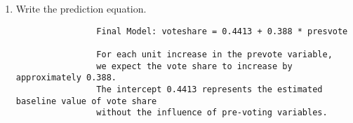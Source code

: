 \documentclass[12pt,letterpaper]{article}
\begin{document}
\begin{enumerate}
\begin{footnotesize}
\begin{verbatim}
			\end{verbatim}
	\end{footnotesize}		
		
		\item Write the prediction equation.
		\vspace{.15cm}
		 
		\begin{footnotesize}
			\begin{verbatim}
				Final Model: voteshare = 0.4413 + 0.388 * presvote
				
				For each unit increase in the prevote variable, 
				we expect the vote share to increase by approximately 0.388. 
				The intercept 0.4413 represents the estimated baseline value of vote share
				without the influence of pre-voting variables.
				
		     \end{verbatim}
	    \end{footnotesize}	
	
		
	\end{enumerate}
	

\vspace{.5cm}
\end{document}
